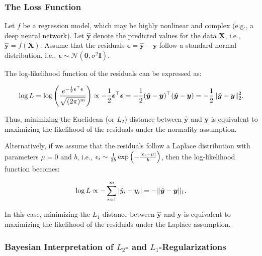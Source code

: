     \subsubsection{The Loss Function}  
        Let \( f \) be a regression model, which may be highly nonlinear and complex (e.g., a deep neural network). Let \( \hat{\bm{y}} \) denote the predicted values for the data \( \bm{X} \), i.e., \( \hat{\bm{y}} = f(\bm{X}) \). Assume that the residuals \( \bm{\epsilon} = \hat{\bm{y}} - \bm{y} \) follow a standard normal distribution, i.e., \( \bm{\epsilon} \sim \mathcal{N}(\bm{0}, \sigma^2 \bm{I}) \).
        
        The log-likelihood function of the residuals can be expressed as:
        
        \begin{equation}
            \log L = \log \left( \frac{e^{-\frac{1}{2} \bm{\epsilon}^\top \bm{\epsilon}}}{\sqrt{(2\pi)^m}} \right) \propto -\frac{1}{2} \bm{\epsilon}^\top \bm{\epsilon} = -\frac{1}{2} (\hat{\bm{y}} - \bm{y})^\top (\hat{\bm{y}} - \bm{y}) = -\frac{1}{2} \lVert\hat{\bm{y}} - \bm{y}\rVert^2_2.
        \end{equation}
        
        Thus, minimizing the Euclidean (or \( L_2 \)) distance between \( \hat{\bm{y}} \) and \( \bm{y} \) is equivalent to maximizing the likelihood of the residuals under the normality assumption.
        
        Alternatively, if we assume that the residuals follow a Laplace distribution with parameters \( \mu=0 \) and \( b \), i.e., \( \epsilon_i \sim \frac{1}{2b} \exp \left( -\frac{| \epsilon_i - \mu |}{b} \right) \), then the log-likelihood function becomes:
        
        \begin{equation}
            \log L \propto -\sum_{i=1}^{m} | \hat{y}_i - y_i | = - \lVert\hat{\bm{y}} - \bm{y}\rVert_1.
        \end{equation}
        
        In this case, minimizing the \( L_1 \) distance between \( \hat{\bm{y}} \) and \( \bm{y} \) is equivalent to maximizing the likelihood of the residuals under the Laplace assumption.

    \subsubsection{Bayesian Interpretation of \( L_2 \)- and \( L_1 \)-Regularizations}
    
